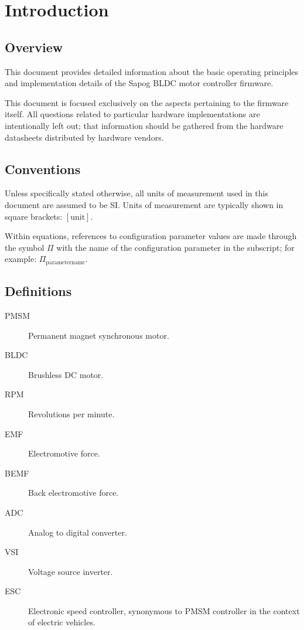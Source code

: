 \documentclass{zubaxdoc}
\begin{document}
\tableofcontents
\clearpage
\listoffigures
\BeginRightColumn
\listoftables

\mainmatter

\chapter{Introduction}

\section{Overview}

This document provides detailed information about the basic operating principles and
implementation details of the Sapog BLDC motor controller firmware.

This document is focused exclusively on the aspects pertaining to the firmware itself.
All questions related to particular hardware implementations are intentionally left out;
that information should be gathered from the hardware datasheets distributed by
hardware vendors.

\section{Conventions}

Unless specifically stated otherwise, all units of measurement used in this document are assumed to be SI.
Units of measurement are typically shown in square brackets: $\left[\text{unit}\right]$.

Within equations, references to configuration parameter values are made through the symbol $\Pi$
with the name of the configuration parameter in the subscript;
for example: $\Pi_\text{parametername}$.

\section{Definitions}

\begin{description}
    \item[PMSM] Permanent magnet synchronous motor.
    \item[BLDC] Brushless DC motor.
    \item[RPM] Revolutions per minute.
    \item[EMF] Electromotive force.
    \item[BEMF] Back electromotive force.
    \item[ADC] Analog to digital converter.
    \item[VSI] Voltage source inverter.
    \item[ESC] Electronic speed controller, synonymous to PMSM controller in the context of electric vehicles.
\end{description}
\end{document}
